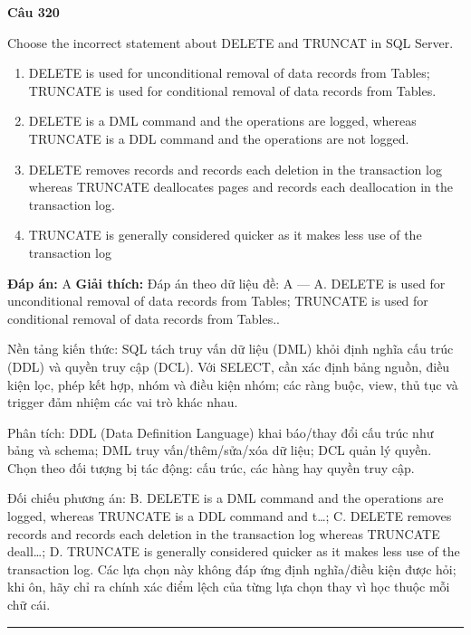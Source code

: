 \documentclass[11pt,a4paper]{article}
\newenvironment{question}[1]{%
  \par\vspace{1em}\noindent\textbf{\large Câu #1}\par\vspace{0.4em}
}{%
  \par\vspace{1em}\hrule\vspace{0.6em}
}
\newenvironment{choices}{%
  \begin{enumerate}[label=\textbf{\Alph*.},leftmargin=2.2em,itemsep=2pt,topsep=3pt]
}{%
  \end{enumerate}
}
\newcommand{\choice}{\item}
\begin{document}
\begin{question}{320}
Choose the incorrect statement about DELETE and TRUNCAT in SQL Server.
\begin{choices}
\choice DELETE is used for unconditional removal of data records from Tables; TRUNCATE is used for conditional removal of data records from Tables.
\choice DELETE is a DML command and the operations are logged, whereas TRUNCATE is a DDL command and the operations are not logged.
\choice DELETE removes records and records each deletion in the transaction log whereas TRUNCATE deallocates pages and records each deallocation in the transaction log.
\choice TRUNCATE is generally considered quicker as it makes less use of the transaction log
\end{choices}
\textbf{Đáp án:} A
\textbf{Giải thích:} Đáp án theo dữ liệu đề: A — A. DELETE is used for unconditional removal of data records from Tables; TRUNCATE is used for conditional removal of data records from Tables..

Nền tảng kiến thức: SQL tách truy vấn dữ liệu (DML) khỏi định nghĩa cấu trúc (DDL) và quyền truy cập (DCL). Với SELECT, cần xác định bảng nguồn, điều kiện lọc, phép kết hợp, nhóm và điều kiện nhóm; các ràng buộc, view, thủ tục và trigger đảm nhiệm các vai trò khác nhau.

Phân tích: DDL (Data Definition Language) khai báo/thay đổi cấu trúc như bảng và schema; DML truy vấn/thêm/sửa/xóa dữ liệu; DCL quản lý quyền. Chọn theo đối tượng bị tác động: cấu trúc, các hàng hay quyền truy cập.

Đối chiếu phương án: B. DELETE is a DML command and the operations are logged, whereas TRUNCATE is a DDL command and t…; C. DELETE removes records and records each deletion in the transaction log whereas TRUNCATE deall…; D. TRUNCATE is generally considered quicker as it makes less use of the transaction log. Các lựa chọn này không đáp ứng định nghĩa/điều kiện được hỏi; khi ôn, hãy chỉ ra chính xác điểm lệch của từng lựa chọn thay vì học thuộc mỗi chữ cái.
\end{question}
\end{document}
